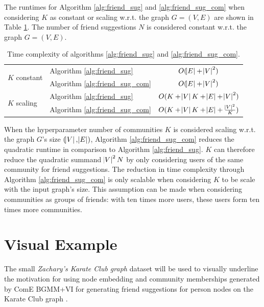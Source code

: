 \documentclass[conference]{IEEEtran}
\begin{document}
The runtimes for Algorithm \ref{alg:friend_sug} and \ref{alg:friend_sug_com} when considering $K$ as constant or scaling w.r.t. the graph $G = (V, E)$ are shown in Table \ref{tab:runtimes}. The number of friend suggestions $N$ is considered constant w.r.t. the graph $G = (V, E)$.

\begin{table}
    \centering
    \caption{Time complexity of algorithms \ref{alg:friend_sug} and \ref{alg:friend_sug_com}.}
    \label{tab:runtimes}
    \begin{tabular}{l l | c}
        \multirow{2}{*}{$K$ constant} & Algorithm \ref{alg:friend_sug}     & $O(\abs{E} + \abs{V}^2)$                          \\
                                      & Algorithm \ref{alg:friend_sug_com} & $O(\abs{E} + \abs{V}^2)$                          \\
        \hline
        \multirow{2}{*}{$K$ scaling}  & Algorithm \ref{alg:friend_sug}     & $O(K + \abs{V}K + \abs{E} + \abs{V}^2)$           \\
                                      & Algorithm \ref{alg:friend_sug_com} & $O(K + \abs{V}K + \abs{E} + \frac{\abs{V}^2}{K})$ \\
    \end{tabular}
\end{table}

When the hyperparameter number of communities $K$ is considered scaling w.r.t. the graph $G$'s size $(\abs{V}, \abs{E})$, Algorithm \ref{alg:friend_sug_com} reduces the quadratic runtime in comparison to Algorithm \ref{alg:friend_sug}.
$K$ can therefore reduce the quadratic summand $\abs{V}^2N$ by only considering users of the same community for friend suggestions. The reduction in time complexity through Algorithm \ref{alg:friend_sug_com} is only scalable when considering $K$ to be scale with the input graph's size. This assumption can be made when considering communities as groups of friends: with ten times more users, these users form ten times more communities.


\section{Visual Example}

The small \textit{Zachary’s Karate Club graph} dataset will be used to visually underline the motivation for using node embedding and community memberships generated by ComE BGMM+VI for generating friend suggestions for person nodes on the Karate Club graph \cite{KarateClubDS}.
\end{document}

